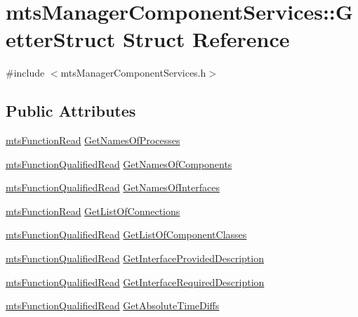 \hypertarget{structmts_manager_component_services_1_1_getter_struct}{\section{mts\-Manager\-Component\-Services\-:\-:Getter\-Struct Struct Reference}
\label{structmts_manager_component_services_1_1_getter_struct}
}


{\ttfamily \#include $<$mts\-Manager\-Component\-Services.\-h$>$}

\subsection*{Public Attributes}
\begin{DoxyCompactItemize}
\item 
\hyperlink{classmts_function_read}{mts\-Function\-Read} \hyperlink{structmts_manager_component_services_1_1_getter_struct_a1873270501352f0f330b0d21f555956c}{Get\-Names\-Of\-Processes}
\item 
\hyperlink{classmts_function_qualified_read}{mts\-Function\-Qualified\-Read} \hyperlink{structmts_manager_component_services_1_1_getter_struct_ae997570edfaea8189ee50a91cfaa1359}{Get\-Names\-Of\-Components}
\item 
\hyperlink{classmts_function_qualified_read}{mts\-Function\-Qualified\-Read} \hyperlink{structmts_manager_component_services_1_1_getter_struct_a0783d016f0e0dc078a89769f2b66f334}{Get\-Names\-Of\-Interfaces}
\item 
\hyperlink{classmts_function_read}{mts\-Function\-Read} \hyperlink{structmts_manager_component_services_1_1_getter_struct_ad44d9caf632a09337d33be8c33d7fe89}{Get\-List\-Of\-Connections}
\item 
\hyperlink{classmts_function_qualified_read}{mts\-Function\-Qualified\-Read} \hyperlink{structmts_manager_component_services_1_1_getter_struct_a8cd33a8253674d0c5c6aa75b0deedba6}{Get\-List\-Of\-Component\-Classes}
\item 
\hyperlink{classmts_function_qualified_read}{mts\-Function\-Qualified\-Read} \hyperlink{structmts_manager_component_services_1_1_getter_struct_a8b792e00dd8c61dc8c80a313ebd9e60c}{Get\-Interface\-Provided\-Description}
\item 
\hyperlink{classmts_function_qualified_read}{mts\-Function\-Qualified\-Read} \hyperlink{structmts_manager_component_services_1_1_getter_struct_a9cd971194963a0674ca99a6021039398}{Get\-Interface\-Required\-Description}
\item 
\hyperlink{classmts_function_qualified_read}{mts\-Function\-Qualified\-Read} \hyperlink{structmts_manager_component_services_1_1_getter_struct_a79a87f5fcd590947491f8c68fcb2705e}{Get\-Absolute\-Time\-Diffs}
\end{DoxyCompactItemize}


